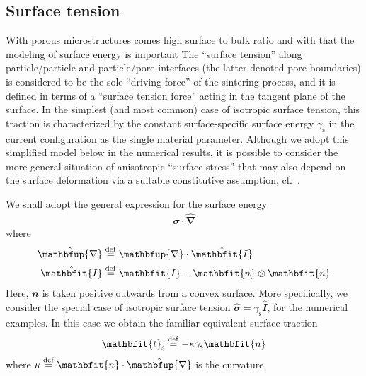 \documentclass[12pt,a4paper,fleqn]{article}
\renewcommand{\ta}[1]{\mathbfit{#1}}
\renewcommand{\ts}[1]{\mathbfit{#1}}
\renewcommand{\diff}{\mathbfup{\nabla}}
\newcommand{\figref}[1]{Figure~\ref{#1}}
\newcommand{\surf}{\mathrm{s}}
\begin{document}
%     


\subsection{Surface tension}

With porous microstructures comes high surface to bulk ratio and with that the modeling of surface energy is important
The ``surface tension'' along particle/particle and particle/pore interfaces (the latter denoted pore boundaries) is considered to be the sole ``driving force'' of the sintering process, and it is defined in terms of a ``surface tension force'' acting in the tangent plane of the surface.
In the simplest (and most common) case of isotropic surface tension, this traction is characterized by the constant surface-specific surface energy $\gamma_\surf$ in the current configuration as the single material parameter.
Although we adopt this simplified model below in the numerical results, it is possible to consider the more general situation of anisotropic ``surface stress'' that may also depend on the surface deformation via a suitable constitutive assumption, cf.\ \cite{Steinmann2008:boundaryenergies}.

We shall adopt the general expression for the surface energy
\begin{align}
  \hat{\ts\sigma} \cdot \hat{\diff}
\label{eq:surface_energy}
\end{align}
where
\begin{align}
  \hat{\diff} &\defeq \diff \cdot \hat{\ts I}
\\
  \hat{\ts I} &\defeq  \ts I - \ta n \outerp \ta n
\end{align}
Here, $\ta{n}$ is taken positive outwards from a convex surface.
More specifically, we consider the special case of isotropic surface tension $\hat{\ts\sigma} = \gamma_\surf \hat{\ts I}$, for the numerical examples.
In this case we obtain the familiar equivalent surface traction
\begin{equation}
    \ta{t}_\surf\defeq -\kappa\gamma_\surf\ta{n}
\label{eq:surface_traction_strong}
\end{equation}
where $\kappa\defeq\ta{n}\cdot\hat{\diff}$ is the curvature.
\end{document}
